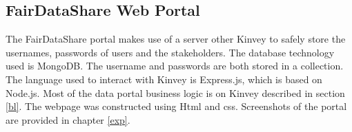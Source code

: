 \subsection{FairDataShare Web Portal}
The FairDataShare portal makes use of a server other Kinvey to safely store the usernames, passwords of users and the stakeholders. The database
technology used is MongoDB. The username and passwords are both stored in a collection. The language used to interact with Kinvey is Express.js, which is based on Node.js. Most of the data portal business logic is on Kinvey described in section \ref{bl}. The webpage was constructed using Html and css. Screenshots of the portal are provided in chapter \ref{exp}.









